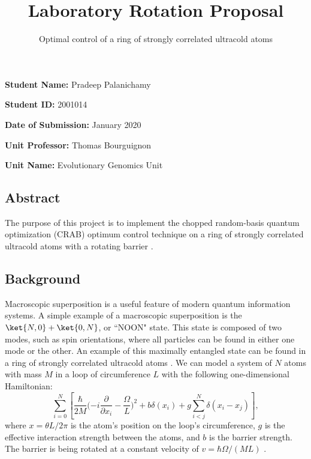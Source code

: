 \documentclass[fontsize=10pt, twocolumn]{scrartcl}	 %
\title{\vspace{-2.8cm}  \color{DarkRed} Laboratory Rotation Proposal} %
\subtitle{Optimal control of a ring of strongly correlated ultracold atoms \vspace{-2cm} }
\date{} %
\begin{document}
\maketitle %
\thispagestyle{fancy} %

 \textbf{Student Name:}  Pradeep Palanichamy
 
 \textbf{Student ID:} 2001014
 
\textbf{Date of Submission:} January 2020

\textbf{Unit Professor:} Thomas Bourguignon

\textbf{Unit Name:} Evolutionary Genomics Unit

\subsection*{Abstract}
The purpose of this project is to implement the chopped random-basis quantum optimization (CRAB) optimum control technique \cite{CRAB} on a ring of strongly correlated ultracold atoms with a rotating barrier \cite{RING}.


\subsection*{Background}
Macroscopic superposition is a useful feature of modern quantum information systems. A simple example of a macroscopic superposition is the $\ket{N,0} + \ket{0,N}$, or ``NOON" state. This state is composed of two modes, such as spin orientations, where all particles can be found in either one mode or the other. An example of this maximally entangled state can be found in a ring of strongly correlated ultracold atoms \cite{RING}. We can model a system of $N$ atoms with mass $M$ in a loop of circumference $L$ with the following one-dimensional Hamiltonian\cite{RING}:
$$\sum_{i=0} ^{N} [{\frac{\hbar}{2M}(-i\frac{\partial}{\partial x_i}-\frac{\Omega}{L}})^2 + b\delta(x_i) +g \sum_{i<j} ^{N} \delta (x_i - x_j )],$$
where $x = \theta L / 2 \pi$ is the atom's position on the loop's circumference, $g$ is the effective interaction strength between the atoms, and $b$ is the barrier strength. The barrier is being rotated at a constant velocity of $v = \hbar \Omega/(ML)$ \cite{RING}. 
\end{document}
